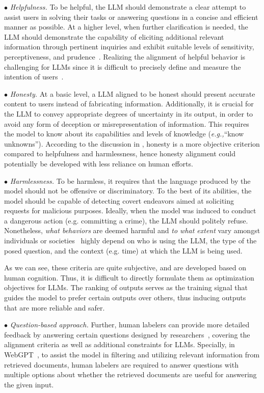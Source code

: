$\bullet$ \emph{Helpfulness.} To be helpful, the LLM should demonstrate a clear attempt to assist users in solving their tasks or answering questions in a concise and efficient manner as possible. At a higher level, when further clarification is needed, the LLM should demonstrate the capability of eliciting  additional relevant information through pertinent inquiries and exhibit suitable levels of sensitivity, perceptiveness, and prudence~\cite{Askell-arxiv-2021-A}. Realizing the alignment of helpful behavior is challenging for LLMs since it is difficult to precisely define and measure the intention of users~\cite{Kenton-arxiv-2021-Alignment}.

$\bullet$ \emph{Honesty.} At a basic level, a LLM aligned to be honest should present accurate content to users instead of fabricating information. Additionally, it is crucial for the LLM to convey appropriate degrees of uncertainty in its output, in order to avoid any form of deception or misrepresentation of information. This requires the model to know about its capabilities and levels of knowledge (\emph{e.g.,}``know unknowns''). According to the discussion in \cite{Askell-arxiv-2021-A}, honesty is a more objective criterion compared to helpfulness and harmlessness, hence honesty alignment could potentially be developed with less reliance on human efforts. 

$\bullet$ \emph{Harmlessness.} To be harmless, it requires that the language produced by the model should not be offensive or discriminatory. To the best of its abilities, the model should be capable of detecting covert endeavors aimed at soliciting requests for malicious purposes. Ideally, when the model was  induced to conduct a dangerous action (e.g. committing a crime), the LLM should politely refuse. Nonetheless, 
\emph{what behaviors} are deemed harmful and \emph{to what extent} vary amongst individuals or  societies~\cite{Askell-arxiv-2021-A} highly  depend on who is using the LLM, the type of the posed question, and the context (e.g. time) at which the LLM is being used.

As we can see, these criteria are quite subjective, and are developed based on human cognition. Thus, it is difficult to directly formulate them as optimization objectives for LLMs. {The ranking of outputs serves as the training signal that guides the model to prefer certain outputs over others, thus inducing outputs that are more reliable and safer.} 

$\bullet$ \emph{Question-based approach.} Further, human labelers can provide more detailed feedback by answering certain questions designed by researchers~\cite{Nakano-arxiv-2021-WebGPT}, covering the alignment criteria as well as additional constraints for LLMs. Specially, in WebGPT~\cite{Nakano-arxiv-2021-WebGPT}, to assist the model in  filtering and utilizing relevant information from retrieved documents, human labelers are required to answer questions with multiple options about whether the retrieved documents are useful for answering the given input. 

